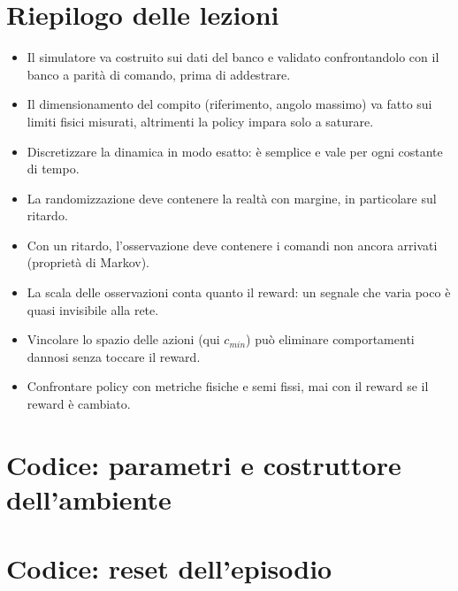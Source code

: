 \documentclass[11pt,a4paper]{article}
\newcommand{\envfile}{../../controller/env_fan.py}
\newcommand{\envlines}[2]{}
\begin{document}
\section{Riepilogo delle lezioni}
\begin{itemize}
\item Il simulatore va costruito sui dati del banco e validato confrontandolo con il banco a parità
  di comando, prima di addestrare.
\item Il dimensionamento del compito (riferimento, angolo massimo) va fatto sui limiti fisici
  misurati, altrimenti la policy impara solo a saturare.
\item Discretizzare la dinamica in modo esatto: è semplice e vale per ogni costante di tempo.
\item La randomizzazione deve contenere la realtà con margine, in particolare sul ritardo.
\item Con un ritardo, l'osservazione deve contenere i comandi non ancora arrivati (proprietà di Markov).
\item La scala delle osservazioni conta quanto il reward: un segnale che varia poco è quasi invisibile alla rete.
\item Vincolare lo spazio delle azioni (qui $c_{min}$) può eliminare comportamenti dannosi senza toccare il reward.
\item Confrontare policy con metriche fisiche e semi fissi, mai con il reward se il reward è cambiato.
\end{itemize}

\appendix
\section{Codice: parametri e costruttore dell'ambiente}
\envlines{41}{58}
\envlines{65}{121}

\section{Codice: reset dell'episodio}
\envlines{238}{262}
\end{document}
